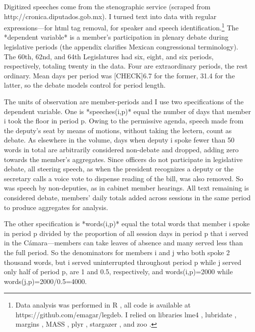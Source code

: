 \documentclass[letter,12pt]{article}
\begin{document}

Digitized speeches come from the stenographic service (scraped from http://cronica.diputados.gob.mx). I turned text into data with regular expressions---for html tag removal, for speaker and speech identification.\footnote{Data analysis was performed in R \citep{r.cite}, all code is available at https://github.com/emagar/legdeb. I relied on libraries lme4 \citep{r.lme4}, lubridate \citep{r.lubridate}, margins \citep{r.margins}, MASS \citep{r.mass}, plyr \citep{r.plyr}, stargazer \citep{r.stargazer}, and zoo \citep{r.zoo}.} The *dependent variable* is a member's participation in plenary debate during legislative periods (the appendix clarifies Mexican congressional terminology). The 60th, 62nd, and 64th Legislatures had six, eight, and six periods, respectively, totaling twenty in the data. Four are extraordinary periods, the rest ordinary. Mean days per period was [CHECK]6.7 for the former, 31.4 for the latter, so the debate models control for period length. 

The units of observation are member-periods and I use two specifications of the dependent variable. One is *speeches(i,p)* equal the number of days that member i took the floor in period p. Owing to the permissive agenda, speech made from the deputy's seat by means of motions, without taking the lectern, count as debate. As elsewhere in the volume, days when deputy i spoke fewer than 50 words in total are arbitrarily considered non-debate and dropped, adding zero towards the member's aggregates. Since officers do not participate in legislative debate, all steering speech, as when the president recognizes a deputy or the secretary calls a voice vote to dispense reading of the bill, was also removed. So was speech by non-deputies, as in cabinet member hearings. All text remaining is considered debate, members' daily totals added across sessions in the same period to produce aggregates for analysis. 



The other specification is *words(i,p)* equal the total words that member i spoke in period p divided by the proportion of all session days in period p that i served in the Cámara---members can take leaves of absence and many served less than the full period. So the denominators for members i and j who both spoke 2 thousand words, but i served uninterrupted throughout period p while j served only half of period p, are 1 and 0.5, respectively, and words(i,p)=2000 while words(j,p)=2000/0.5=4000. 
\end{document}
